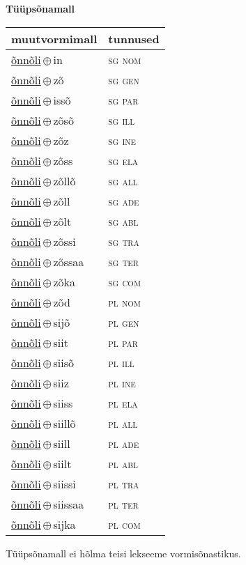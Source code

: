 

\vspace{3.5em}
\noindent \begin{minipage}{\textwidth}
\noindent \textbf{Tüüpsõnamall \,}\\

\begin{sideways}
\begin{tabular}{l l}
muutvormimall & tunnused \\
\hline
\underline{õnnõli}\,$\oplus$\,in & \textsc{ sg nom } \\
\underline{õnnõli}\,$\oplus$\,zõ & \textsc{ sg gen } \\
\underline{õnnõli}\,$\oplus$\,issõ & \textsc{ sg par } \\
\underline{õnnõli}\,$\oplus$\,zõsõ & \textsc{ sg ill } \\
\underline{õnnõli}\,$\oplus$\,zõz & \textsc{ sg ine } \\
\underline{õnnõli}\,$\oplus$\,zõss & \textsc{ sg ela } \\
\underline{õnnõli}\,$\oplus$\,zõllõ & \textsc{ sg all } \\
\underline{õnnõli}\,$\oplus$\,zõll & \textsc{ sg ade } \\
\underline{õnnõli}\,$\oplus$\,zõlt & \textsc{ sg abl } \\
\underline{õnnõli}\,$\oplus$\,zõssi & \textsc{ sg tra } \\
\underline{õnnõli}\,$\oplus$\,zõssaa & \textsc{ sg ter } \\
\underline{õnnõli}\,$\oplus$\,zõka & \textsc{ sg com } \\
\underline{õnnõli}\,$\oplus$\,zõd & \textsc{ pl nom } \\
\underline{õnnõli}\,$\oplus$\,sijõ & \textsc{ pl gen } \\
\underline{õnnõli}\,$\oplus$\,siit & \textsc{ pl par } \\
\underline{õnnõli}\,$\oplus$\,siisõ & \textsc{ pl ill } \\
\underline{õnnõli}\,$\oplus$\,siiz & \textsc{ pl ine } \\
\underline{õnnõli}\,$\oplus$\,siiss & \textsc{ pl ela } \\
\underline{õnnõli}\,$\oplus$\,siillõ & \textsc{ pl all } \\
\underline{õnnõli}\,$\oplus$\,siill & \textsc{ pl ade } \\
\underline{õnnõli}\,$\oplus$\,siilt & \textsc{ pl abl } \\
\underline{õnnõli}\,$\oplus$\,siissi & \textsc{ pl tra } \\
\underline{õnnõli}\,$\oplus$\,siissaa & \textsc{ pl ter } \\
\underline{õnnõli}\,$\oplus$\,sijka & \textsc{ pl com } \\
\end{tabular}
\end{sideways}
\label{tab:tüüpsõnamall-õnnõliin}

\end{minipage}

 
\vspace{1em}
\noindent Tüüpsõnamall  ei hõlma teisi lekseeme vormi\-sõnastikus.
